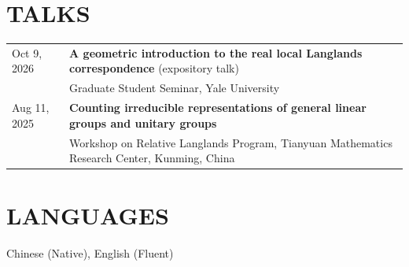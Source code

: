 \documentclass[11pt,a4paper]{article}
\begin{document}
\section{TALKS}
\noindent
\begin{tabularx}{\textwidth}{@{}l >{\raggedright\arraybackslash}X@{}}
Oct 9, 2026 & \textbf{A geometric introduction to the real local Langlands correspondence} (expository talk) \\
& Graduate Student Seminar, Yale University \\[6pt]
Aug 11, 2025 & \textbf{Counting irreducible representations of general linear groups and unitary groups} \\
& Workshop on Relative Langlands Program, Tianyuan Mathematics Research Center, Kunming, China \\
\end{tabularx}


\section{LANGUAGES}
Chinese (Native), English (Fluent)
\end{document}
